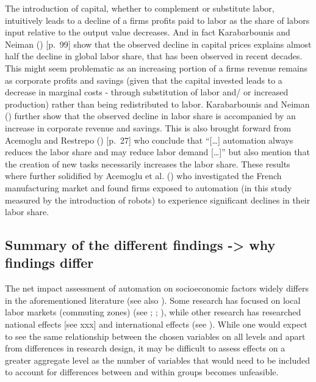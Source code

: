\documentclass[
  11,
  a4paperpaper,
]{article}
\begin{document}
The introduction of capital, whether to complement or substitute labor,
intuitively leads to a decline of a firms profits paid to labor as the
share of labors input relative to the output value decreases. And in
fact Karabarbounis and Neiman
() {[}p.~99{]} show that
the observed decline in capital prices explains almost half the decline
in global labor share, that has been observed in recent decades. This
might seem problematic as an increasing portion of a firms revenue
remains as corporate profits and savings (given that the capital
invested leads to a decrease in marginal costs - through substitution of
labor and/ or increased production) rather than being redistributed to
labor. Karabarbounis and Neiman
() further show
that the observed decline in labor share is accompanied by an increase
in corporate revenue and savings. This is also brought forward from
Acemoglu and Restrepo ()
{[}p.~27{]} who conclude that ``{[}\ldots{]} automation always reduces
the labor share and may reduce labor demand {[}\ldots{]}'' but also
mention that the creation of new tasks necessarily increases the labor
share. These results where further solidified by Acemoglu et al.
() who investigated
the French manufacturing market and found firms exposed to automation
(in this study measured by the introduction of robots) to experience
significant declines in their labor share.

\subsection{Summary of the different findings -\textgreater{} why
findings
differ}\label{summary-of-the-different-findings---why-findings-differ}

The net impact assessment of automation on socioeconomic factors widely
differs in the aforementioned literature (see also
). Some
research has focused on local labor markets (commuting zones) (see
;
;
), while other
research has researched national effects {[}see xxx{]} and international
effects (see ). While one would expect to see the same relationship between the
chosen variables on all levels and apart from differences in research
design, it may be difficult to assess effects on a greater aggregate
level as the number of variables that would need to be included to
account for differences between and within groups becomes unfeasible.
\end{document}
